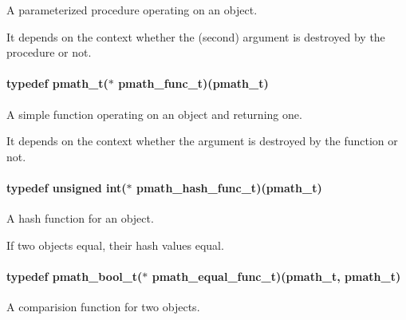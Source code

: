 A parameterized procedure operating on an object. 

It depends on the context whether the (second) argument is destroyed by the procedure or not. \hypertarget{group__objects_g9dd57b578f42f0556a7d1c1709f97847}{
\paragraph[{pmath\_\-func\_\-t}]{\setlength{\rightskip}{0pt plus 5cm}typedef {\bf pmath\_\-t}($\ast$ {\bf pmath\_\-func\_\-t})({\bf pmath\_\-t})}\hfill}
\label{group__objects_g9dd57b578f42f0556a7d1c1709f97847}


A simple function operating on an object and returning one. 

It depends on the context whether the argument is destroyed by the function or not. \hypertarget{group__objects_gf7afa773c11a686f6abd7586e0a6a33d}{
\paragraph[{pmath\_\-hash\_\-func\_\-t}]{\setlength{\rightskip}{0pt plus 5cm}typedef unsigned int($\ast$ {\bf pmath\_\-hash\_\-func\_\-t})({\bf pmath\_\-t})}\hfill}
\label{group__objects_gf7afa773c11a686f6abd7586e0a6a33d}


A hash function for an object. 

If two objects equal, their hash values equal. \hypertarget{group__objects_g3596be6b7da718f547985fdde3d8edd1}{
\paragraph[{pmath\_\-equal\_\-func\_\-t}]{\setlength{\rightskip}{0pt plus 5cm}typedef {\bf pmath\_\-bool\_\-t}($\ast$ {\bf pmath\_\-equal\_\-func\_\-t})({\bf pmath\_\-t}, {\bf pmath\_\-t})}\hfill}
\label{group__objects_g3596be6b7da718f547985fdde3d8edd1}


A comparision function for two objects. 

